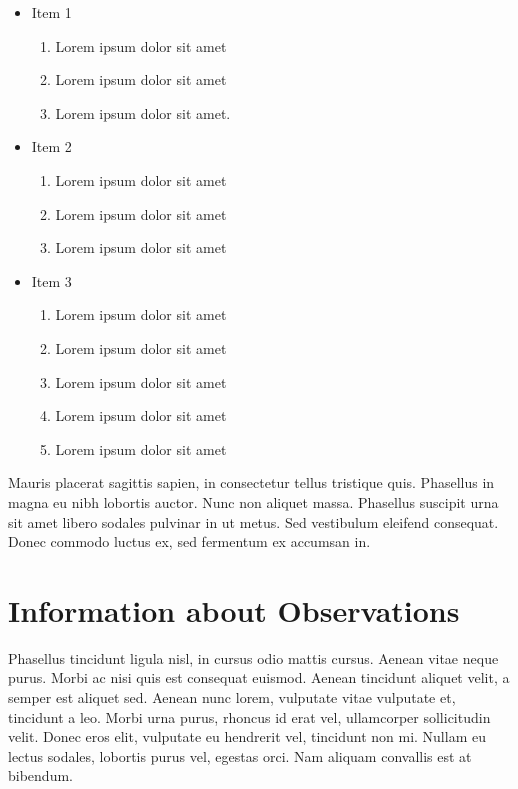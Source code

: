 \documentclass[linenumbers,RNAAS,trackchanges]{aastex631}
\begin{document}
\begin{itemize}
 \item{Item 1}
   \begin{enumerate}
      \item Lorem ipsum dolor sit amet
      \item Lorem ipsum dolor sit amet
      \item Lorem ipsum dolor sit amet.
    \end{enumerate}
  \item{Item 2}
    \begin{enumerate}
      \item Lorem ipsum dolor sit amet
      \item Lorem ipsum dolor sit amet
      \item Lorem ipsum dolor sit amet
    \end{enumerate}
  \item{Item 3}
    \begin{enumerate}
      \item Lorem ipsum dolor sit amet
      \item Lorem ipsum dolor sit amet
      \item Lorem ipsum dolor sit amet
      \item Lorem ipsum dolor sit amet
      \item Lorem ipsum dolor sit amet
    \end{enumerate}
\end{itemize}

Mauris placerat sagittis sapien, in consectetur tellus tristique quis. Phasellus in magna eu nibh lobortis auctor. Nunc non aliquet massa. Phasellus suscipit urna sit amet libero sodales pulvinar in ut metus. Sed vestibulum eleifend consequat. Donec commodo luctus ex, sed fermentum ex accumsan in.

\section{Information about Observations}
Phasellus tincidunt ligula nisl, in cursus odio mattis cursus. Aenean vitae neque purus. Morbi ac nisi quis est consequat euismod. Aenean tincidunt aliquet velit, a semper est aliquet sed. Aenean nunc lorem, vulputate vitae vulputate et, tincidunt a leo. Morbi urna purus, rhoncus id erat vel, ullamcorper sollicitudin velit. Donec eros elit, vulputate eu hendrerit vel, tincidunt non mi. Nullam eu lectus sodales, lobortis purus vel, egestas orci. Nam aliquam convallis est at bibendum.
\end{document}
